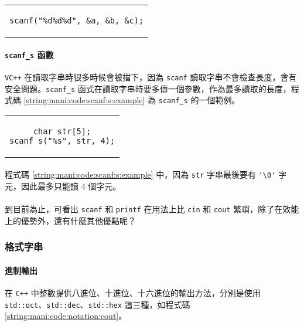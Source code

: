\documentclass[12pt,a4paper,oneside]{article}
\begin{document}
\begin{CJK}{UTF8}{bkai}
\begin{code}[h!]
  \centering
  \begin{tabular}{c}
  \begin{lstlisting}
scanf("%d%d%d", &a, &b, &c);
  \end{lstlisting}
  \end{tabular}
  \caption{\lstinline!scanf! 範例}
  \label{string:mani:code:scanf:example}
\end{code}

\paragraph{\lstinline!scanf_s! 函數}\texttt{VC++} 在讀取字串時很多時候會被擋下，因為 \lstinline!scanf! 讀取字串不會檢查長度，會有安全問題。\lstinline!scanf_s! 函式在讀取字串時要多傳一個參數，作為最多讀取的長度，程式碼 \ref{string:mani:code:scanf:s:example} 為 \lstinline!scanf_s! 的一個範例。

\begin{code}[h!]
  \centering
  \begin{tabular}{c}
  \begin{lstlisting}
char str[5];
scanf_s("%s", str, 4);
  \end{lstlisting}
  \end{tabular}
  \caption{\lstinline!scanf_s! 的範例}
  \label{string:mani:code:scanf:s:example}
\end{code}

\paragraph{}程式碼 \ref{string:mani:code:scanf:s:example} 中，因為 \lstinline!str! 字串最後要有 \lstinline!'\0'! 字元，因此最多只能讀 4 個字元。
\paragraph{}到目前為止，可看出 \lstinline!scanf! 和 \lstinline!printf! 在用法上比 \lstinline!cin! 和 \lstinline!cout! 繁瑣，除了在效能上的優勢外，還有什麼其他優點呢？

\subsubsection{格式字串}

\paragraph{進制輸出}在 \texttt{C++} 中整數提供八進位、十進位、十六進位的輸出方法，分別是使用 \lstinline!std::oct!、\lstinline!std::dec!、\lstinline!std::hex! 這三種，如程式碼 \ref{string:mani:code:notation:cout}。


\end{CJK}
\end{document}
